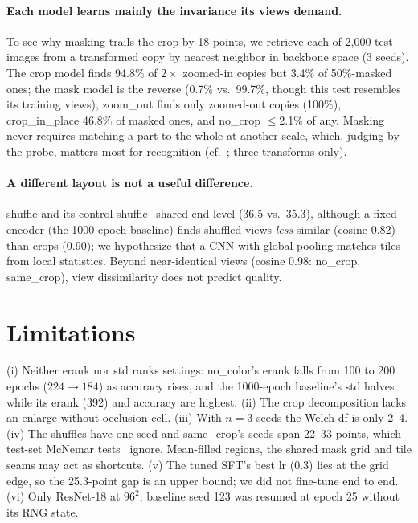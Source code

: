 \documentclass[10pt,twocolumn,letterpaper]{article}
\begin{document}
\paragraph{Each model learns mainly the invariance its views demand.}
To see why masking trails the crop by 18 points, we retrieve each of 2,000 test images from a transformed copy by nearest neighbor in backbone space (3 seeds).
The crop model finds 94.8\% of $2\times$ zoomed-in copies but 3.4\% of 50\%-masked ones; the mask model is the reverse (0.7\% vs.\ 99.7\%, though this test resembles its training views), zoom\_out finds only zoomed-out copies (100\%), crop\_in\_place 46.8\% of masked ones, and no\_crop $\le$2.1\% of any.
Masking never requires matching a part to the whole at another scale, which, judging by the probe, matters most for recognition (cf.~\cite{purushwalkam2020demystifying}; three transforms only).

\paragraph{A different layout is not a useful difference.}
shuffle and its control shuffle\_shared end level (36.5 vs.\ 35.3), although a fixed encoder (the 1000-epoch baseline) finds shuffled views \emph{less} similar (cosine 0.82) than crops (0.90); we hypothesize that a CNN with global pooling matches tiles from local statistics. Beyond near-identical views (cosine 0.98: no\_crop, same\_crop), view dissimilarity does not predict quality.


\section{Limitations}
\label{sec:limitations}

(i) Neither erank nor std ranks settings: no\_color's erank falls from 100 to 200 epochs ($224\to184$) as accuracy rises, and the 1000-epoch baseline's std halves while its erank (392) and accuracy are highest. (ii) The crop decomposition lacks an enlarge-without-occlusion cell. (iii) With $n{=}3$ seeds the Welch df is only 2--4. (iv) The shuffles have one seed and same\_crop's seeds span 22--33 points, which test-set McNemar tests~\cite{mcnemar1947} ignore. Mean-filled regions, the shared mask grid and tile seams may act as shortcuts.
(v) The tuned SFT's best lr (0.3) lies at the grid edge, so the 25.3-point gap is an upper bound; we did not fine-tune end to end. (vi) Only ResNet-18 at $96^2$; baseline seed 123 was resumed at epoch 25 without its RNG state.
\end{document}
